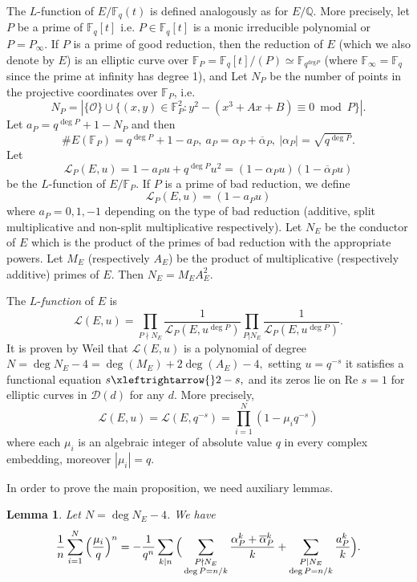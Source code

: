 \documentclass[12pt,reqno]{amsart}
\newcommand{\Q}{\mathbb{Q}}
\newcommand{\BF}{\mathbb{F}}
\newcommand{\CL}{\mathcal{L}}
\newtheorem{lem}{Lemma}[subsection]
\begin{document}
The $L$-function of $E/\BF_{q}(t)$ is defined analogously as for $E/\Q.$ More precisely, let $P$ be a prime of $\BF_{q}[t]$ i.e. $P \in \BF_{q}[t]$ is a monic irreducible polynomial or $P=P_{\infty}.$  If $P$ is a prime of good reduction, then the reduction of $E$ (which we also denote by $E$) is an elliptic curve over $\BF_{P}=\BF_{q}[t]/(P) \simeq \BF_{q^{\text{deg} P}}$ (where $\BF_{\infty}=\BF_{q}$ since the prime at infinity has degree 1), and
Let $N_P$ be the number of points in the projective coordinates over $\BF_{P}$, i.e. 
$$
N_P = | \{ \mathcal{O} \} \cup \{(x,y) \in \BF_{P}^2 : y^2 - (x^3 + Ax + B) \equiv 0\bmod P\} |.
$$
Let $a_P = q^{\deg P} + 1 - N_{P}$ and then 
$$
\#E(\BF_{P})= q^{\deg P} + 1 - a_P, \ a_P = \alpha_P + \overline{\alpha}_P, \ |\alpha_P |= \sqrt{q^{\deg P}}.
$$
Let 
$$
\mathcal{L}_P (E, u)= 1- a_P u + q^{\deg P} u^2= (1-\alpha_P u) (1 - \overline{\alpha}_P u)
$$
be the $L$-function of $E/\BF_{P}.$ If $P$ is a prime of bad reduction, we define
$$
\mathcal{L}_P(E,u)= (1-a_P u)
$$
where $a_P= 0, 1, -1$ depending on the type of bad reduction (additive, split multiplicative and non-split multiplicative respectively). Let $N_E$ be the conductor of $E$ which is the product of the primes of bad reduction with the appropriate powers. Let $M_E$ (respectively $A_E$) be the product of multiplicative (respectively additive) primes of $E$.
Then $N_E = M_E A_E^2$.

The $L$-\textit{function} of $E$ is
$$
\mathcal{L}(E,u)= \prod_{P \nmid N_E} \frac{1}{\mathcal{L}_P(E,u^{\deg P})} \prod_{P | N_E} \frac{1}{\mathcal{L}_P(E,u^{\deg P})}.
$$
It is proven by Weil that $\mathcal{L}(E,u)$ is a polynomial of degree $ N= \deg N_E - 4= \deg (M_{E}) + 2\deg(A_E) -4,$ setting $u=q^{-s}$ it satisfies a functional equation $s \xleftrightarrow{} 2-s,$ and its zeros lie on Re $s=1$ for elliptic curves in $\mathcal{D}(d)$ for any $d$. More precisely,
$$
\CL(E,u)= \CL(E,q^{-s})= \prod_{i=1}^{N} (1-\mu_i q^{-s}) 
$$
where each $\mu_i$ is an algebraic integer of absolute value $q$ in every complex embedding, moreover $|\mu_{i}| = q$.


In order to prove the main proposition, we need auxiliary lemmas. 

\begin{lem}\label{lemma1} Let $N = \deg N_E - 4$. We have
    \begin{align}\relax
\frac{1}{n}\sum\limits_{i=1}^{N} \Big ( \frac{\mu_i}{q} \Big )^n = - \frac{1}{q^n} \sum\limits_{k |n} \Big (\sum_{\substack{P \nmid N_E \\ \deg P = n/k}} \frac{\alpha_{P}^k + \overline{\alpha}_{P}^k}{k} + \sum_{\substack{P | N_E \\ \deg P = n/k}} \frac{a_{P}^k}{k} \Big ).
\end{align}
\end{lem}
\end{document}
